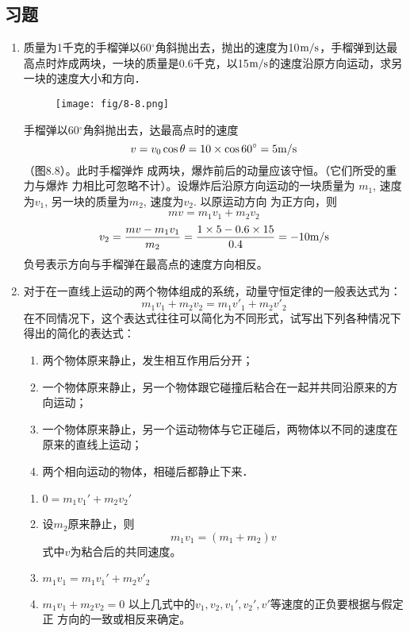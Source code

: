\subsection{习题}
\begin{enumerate}
    \item 质量为1千克的手榴弹以60$^\circ$角斜抛出去，抛出的速度为10$\text{m}/\text{s}$，手榴弹到达最高点时炸成两块，一块的质量是0.6千克，以15$\text{m}/\text{s}$的速度沿原方向运动，求另一块的速度大小和方向．

\begin{figure}[htp]
    \centering
    \texttt{[image: fig/8-8.png]}
    \caption{}
\end{figure}

    \begin{solution}
手榴弹以60$^\circ$角斜抛出去，达最高点时的速度
\[v=v_0\cos\theta=10\times\cos60^{\circ}=5\text{m}/\text{s}\]
（图8.8）。此时手榴弹炸
成两块，爆炸前后的动量应该守恒。（它们所受的重力与爆炸
力相比可忽略不计）。设爆炸后沿原方向运动的一块质量为
$m_1$, 速度为$v_1$, 另一块的质量为$m_2$, 速度为$v_2$. 以原运动方向
为正方向，则
\[mv=m_1v_1+m_2v_2\]
\[v_2=\frac{mv-m_1v_1}{m_2}=\frac{1\times 5-0.6\times 15}{0.4}=-10\text{m}/\text{s}\]
负号表示方向与手榴弹在最高点的速度方向相反。
    \end{solution}
    \item 对于在一直线上运动的两个物体组成的系统，动量守恒定律的一般表达式为：
\[m_1v_1+m_2v_2=m_1v'_1+m_2v'_2 \]
    在不同情况下，这个表达式往往可以简化为不同形式，试写出下列各种情况下得出的简化的表达式：
\begin{enumerate}
    \item 两个物体原来静止，发生相互作用后分开；
    \item 一个物体原来静止，另一个物体跟它碰撞后粘合在一起并共同沿原来的方向运动；
    \item 一个物体原来静止，另一个运动物体与它正碰后，两物体以不同的速度在原来的直线上运动；
    \item 两个相向运动的物体，相碰后都静止下来．
\end{enumerate}

\begin{solution}
\begin{enumerate}
    \item $0=m_1v_1'+m_2v_2'$
\item 设$m_2$原来静止，则
\[m_1v_1=(m_1+m_2)v\]
式中$v$为粘合后的共同速度。
\item $m_1v_1=m_1v_1'+m_2v'_2$
\item $m_1v_1+m_2v_2=0$
以上几式中的$v_1,v_2,v_1',v_2',v'$等速度的正负要根据与假定正
方向的一致或相反来确定。


\end{enumerate}
\end{solution}
\end{enumerate}

